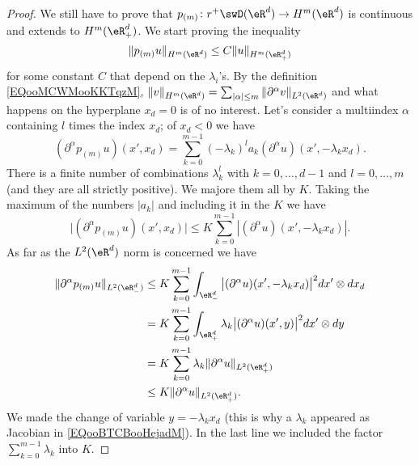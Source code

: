\begin{proof}
    We still have to prove that \(p_{(m)}\colon r^+\swD(\eR^d)\to H^m(\eR^d)\) is continuous and extends to \( H^m(\eR^d_+)\). We start proving the inequality
    \begin{equation}
        \| p_{(m)}u \|_{H^m(\eR^d)}\leq C \| u \|_{H^m(\eR^d_+)}
    \end{equation}
    for some constant \( C\) that depend on the \( \lambda_i\)'s. By the definition \ref{EQooMCWMooKKTqzM}, \( \| v \|_{H^m(\eR^d)}=\sum_{| \alpha |\leq m}\| \partial^{\alpha}v \|_{L^2(\eR^d)}\) and what happens on the hyperplane \( x_d=0\) is of no interest. Let's consider a multiindex \( \alpha\) containing \( l\) times the index \( x_d\); of \( x_d<0\) we have
    \begin{equation}
        (\partial^{\alpha}p_{(m)}u)(x',x_d)=\sum_{k=0}^{m-1}(-\lambda_k)^la_k(\partial^{\alpha}u)(x',-\lambda_kx_d).
    \end{equation}
    There is a finite number of combinations \( \lambda_k^l\) with \( k=0,\ldots, d-1\) and \( l=0,\ldots, m\) (and they are all strictly positive). We majore them all by \( K\). Taking the maximum of the numbers \( | a_k |\) and including it in the \( K\) we have
    \begin{equation}
        \big| (\partial^{\alpha}p_{(m)}u)(x',x_d) \big|\leq K \sum_{k=0}^{m-1}| (\partial^{\alpha}u)(x',-\lambda_k x_d) |.
    \end{equation}
    As far as the \( L^2(\eR^d)\) norm is concerned we have
    \begin{subequations}
        \begin{align}
            \| \partial^{\alpha}p_{(m)}u \|_{L^2(\eR^d_-)}&\leq K\sum_{k=0}^{m-1}\int_{\eR^d_-}\big| (\partial^{\alpha}u)(x',-\lambda_k x_d) \big|^2dx'\otimes dx_d\\
            &=K\sum_{k=0}^{m-1}\int_{\eR^d_+}\lambda_k\big| (\partial^{\alpha}u)(x',y) \big|^2dx'\otimes dy  \label{EQooBTCBooHejadM}\\
            &=K\sum_{k=0}^{m-1}\lambda_k\| \partial^{\alpha}u \|_{L^2(\eR^d_+)}\\
            &\leq K\| \partial^{\alpha}u \|_{L^2(\eR^d_+)}.
        \end{align}
    \end{subequations}
    We made the change of variable \(y=-\lambda_k x_d\) (this is why a \( \lambda_k\) appeared as Jacobian in \eqref{EQooBTCBooHejadM}). In the last line we included the factor \( \sum_{k=0}^{m-1}\lambda_k\) into \( K\). 


\end{proof}
